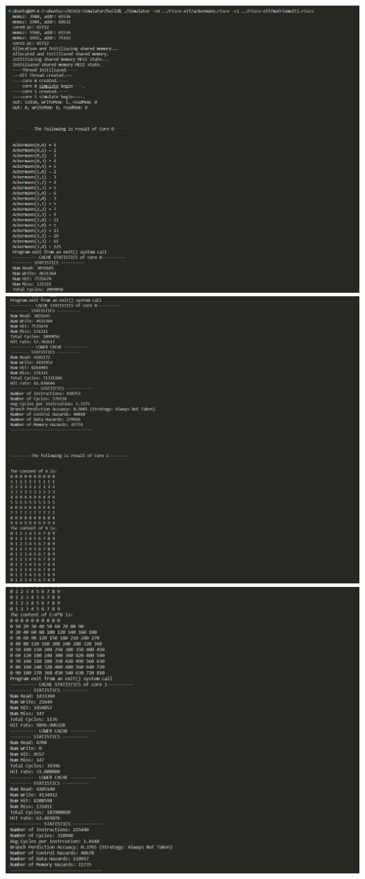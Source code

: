\mathbb{R} \documentclass{article}
\begin{document}
\begin{center}
  \includegraphics[scale = 0.28]{4.png}
  \includegraphics[scale = 0.3]{5.png}
  \includegraphics[scale = 0.3]{6.png}
\end{center}
\end{document}
